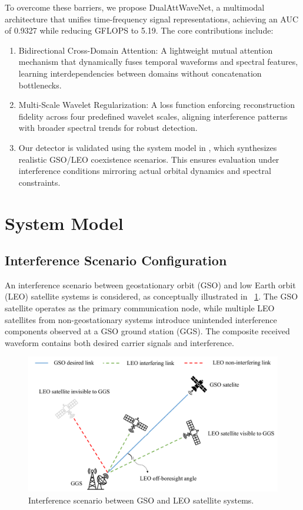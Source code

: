 \documentclass[conference]{IEEEtran}
\begin{document}
To overcome these barriers, we propose DualAttWaveNet, a multimodal architecture that unifies time-frequency signal representations, achieving an AUC of 0.9327 while reducing GFLOPS to 5.19. The core contributions include:

\begin{enumerate}
    \item Bidirectional Cross-Domain Attention: A lightweight mutual attention mechanism that dynamically fuses temporal waveforms and spectral features, learning interdependencies between domains without concatenation bottlenecks.
    \item Multi-Scale Wavelet Regularization: A loss function enforcing reconstruction fidelity across four predefined wavelet scales, aligning interference patterns with broader spectral trends for robust detection.
    \item Our detector is validated using the system model in \cite{saifaldawlaGenAIBasedModelsNGSO2024}, which synthesizes realistic GSO/LEO coexistence scenarios. This ensures evaluation under interference conditions mirroring actual orbital dynamics and spectral constraints.
\end{enumerate}

\section{System Model}
\label{sec:system_model}

\subsection{Interference Scenario Configuration}
An interference scenario between geostationary orbit (GSO) and low Earth orbit (LEO) satellite systems is considered, as conceptually illustrated in \figurename~\ref{fig:interference-scenario}. The GSO satellite operates as the primary communication node, while multiple LEO satellites from non-geostationary systems introduce unintended interference components observed at a GSO ground station (GGS). The composite received waveform contains both desired carrier signals and interference.

\begin{figure}[tb]
    \centering
    \includegraphics[width=\linewidth]{system-model.pdf}
    \caption{Interference scenario between GSO and LEO satellite systems.}
    \label{fig:interference-scenario}
\end{figure}
\end{document}
